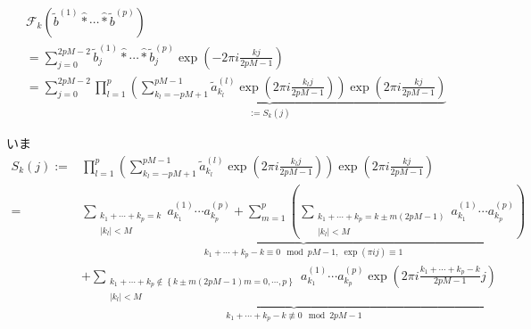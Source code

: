 \documentclass[11pt,a4paper]{jsarticle}
\theoremstyle{definition}
\begin{document}
\begin{description}
\begin{align*}
       & \mathcal{F}_k \left( \tilde{b}^{(1)} \hat{*} \cdots \hat{*} \tilde{b}^{(p)} \right)                                                                                                                            \\
       & = \sum_{j=0}^{2pM-2}  \tilde{b}^{(1)}_j \hat{*} \cdots \hat{*} \tilde{b}^{(p)}_j \exp\left(-2\pi i \frac{kj}{2pM-1}\right)                                                                                     \\
       & = \sum_{j=0}^{2pM-2} \underbrace{ \prod_{l=1}^p  \left( \sum_{k_l=-pM+1}^{pM-1} \tilde{a}_{k_l}^{(l)} \exp\left(2\pi i \frac{k_lj}{2pM-1} \right) \right) \exp\left(2\pi i \frac{kj}{2pM-1}\right)}_{:=S_k(j)}
    \end{align*}

    いま
    \begin{align*}
      S_k(j) := & \prod_{l=1}^p  \left( \sum_{k_l=-pM+1}^{pM-1} \tilde{a}_{k_l}^{(l)} \exp\left(2\pi i \frac{k_lj}{2pM-1} \right) \right) \exp\left(2\pi i \frac{kj}{2pM-1}\right) \\
      =         & \underbrace{\sum_{\substack{{k_1+\cdots+k_p=k}                                                                                                                   \\ {|k_l|<M}}} a_{k_1}^{(1)}\cdots a_{k_p}^{(p)} + \sum_{m=1}^{p} \left( \sum_{\substack{k_1+\cdots+k_p=k \pm m(2pM-1) \\ |k_l|<M}} a_{k_1}^{(1)} \cdots a_{k_p}^{(p)} \right) }_{k_1+\cdots+k_p-k \equiv 0 \mod pM-1,\ \exp(\pi ij)\equiv 1} \\
                & + \underbrace{\sum_{\substack{k_1+\cdots+k_p \notin \left\{ k \pm m(2pM-1)m=0,\cdots,p \right\}                                                                  \\ |k_l|<M}} a_{k_1}^{(1)} \cdots a_{k_p}^{(p)} \exp \left( 2\pi i \frac{k_1+\cdots+k_p-k}{2pM-1}j \right)}_{k_1+\cdots+k_p-k \not\equiv 0 \mod 2pM-1}
    \end{align*}


\end{description}
\end{document}
